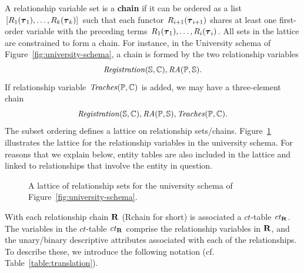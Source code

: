 \documentclass{acm_proc_article-sp}
\newcommand{\ct}{\mathit{ct}}
\begin{document}
A relationship variable set is a \textbf{chain} if it can be ordered as a list $[R_{1}(\boldsymbol{\tau}_{1}),\ldots,R_{k}(\boldsymbol{\tau}_{k})]$ 
such that each functor $R_{i+1}(\boldsymbol{\tau}_{i+1})$ shares at least one first-order variable with the preceding terms $R_{1}(\boldsymbol{\tau}_{1}),\ldots,R_{i}(\boldsymbol{\tau}_{i})$.
All sets in the lattice are constrained to form a chain.
%
For instance, in the University schema of Figure~\ref{fig:university-schema}, a %
chain is formed by the two relationship variables
\[\mathit{Registration}(\mathbb{S},\mathbb{C}),\mathit{RA}(\mathbb{P},\mathbb{S}).\]
If relationship variable $\it{Teaches}(\mathbb{P},\mathbb{C})$ is added,
we may have a three-element chain \[\mathit{Registration}(\mathbb{S},\mathbb{C}),\mathit{RA}(\mathbb{P},\mathbb{S}),\it{Teaches}(\mathbb{P},\mathbb{C}).\] 
The subset ordering defines a lattice on relationship sets/chains. 
Figure~\ref{fig:big-lattice} illustrates the  lattice for the relationship variables in the university schema. 
For reasons that we explain below, entity tables are also included in the lattice and linked to relationships that involve the entity in question. 
\begin{figure}[htbp]
\begin{center}

\caption{A lattice of relationship sets for the university schema of Figure~\ref{fig:university-schema}.
\label{fig:big-lattice}}
\end{center}
\end{figure}
%
With each relationship chain $\mathbf{R}$ (Rchain for short) is associated a $\ct$-table $\ct_{\set{\Relation}}$. 
The variables in the $\ct$-table  $\ct_{\set{\Relation}}$ %
 comprise the relationship variables  in $\mathbf{R}$, and the unary/binary descriptive attributes associated with each of the relationships. To describe these, we introduce the following notation (cf. Table~\ref{table:translation}).
\end{document}
